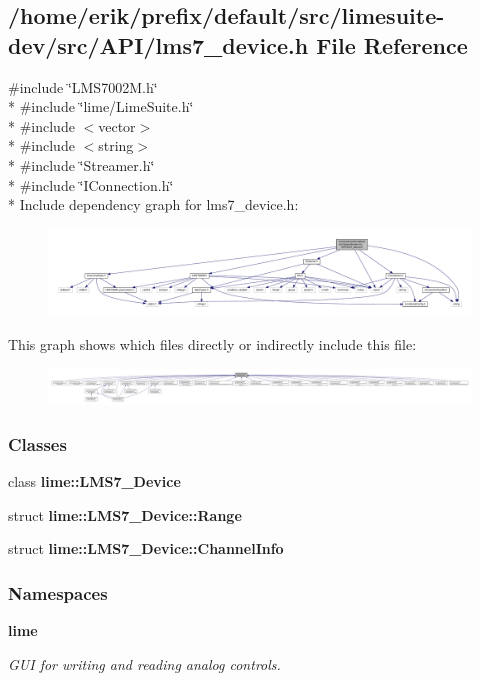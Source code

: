 \subsection{/home/erik/prefix/default/src/limesuite-\/dev/src/\+A\+P\+I/lms7\+\_\+device.h File Reference}
\label{lms7__device_8h}
{\ttfamily \#include \char`\"{}L\+M\+S7002\+M.\+h\char`\"{}}\\*
{\ttfamily \#include \char`\"{}lime/\+Lime\+Suite.\+h\char`\"{}}\\*
{\ttfamily \#include $<$vector$>$}\\*
{\ttfamily \#include $<$string$>$}\\*
{\ttfamily \#include \char`\"{}Streamer.\+h\char`\"{}}\\*
{\ttfamily \#include \char`\"{}I\+Connection.\+h\char`\"{}}\\*
Include dependency graph for lms7\+\_\+device.\+h\+:
\nopagebreak
\begin{figure}[H]
\begin{center}
\leavevmode
\includegraphics[width=350pt]{d6/de3/lms7__device_8h__incl}
\end{center}
\end{figure}
This graph shows which files directly or indirectly include this file\+:
\nopagebreak
\begin{figure}[H]
\begin{center}
\leavevmode
\includegraphics[width=350pt]{d0/d32/lms7__device_8h__dep__incl}
\end{center}
\end{figure}
\subsubsection*{Classes}
\begin{DoxyCompactItemize}
\item 
class {\bf lime\+::\+L\+M\+S7\+\_\+\+Device}
\item 
struct {\bf lime\+::\+L\+M\+S7\+\_\+\+Device\+::\+Range}
\item 
struct {\bf lime\+::\+L\+M\+S7\+\_\+\+Device\+::\+Channel\+Info}
\end{DoxyCompactItemize}
\subsubsection*{Namespaces}
\begin{DoxyCompactItemize}
\item 
 {\bf lime}
\begin{DoxyCompactList}\small\item\em G\+UI for writing and reading analog controls. \end{DoxyCompactList}\end{DoxyCompactItemize}
